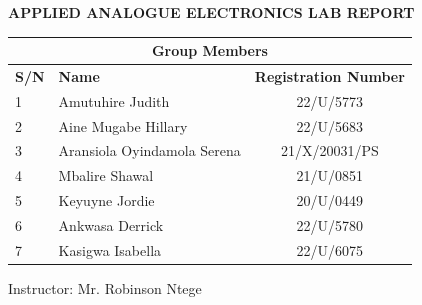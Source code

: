 \documentclass[12pt,a4paper]{article}
\begin{document}
\begin{titlepage}
\begin{center}
            \textbf{\Large APPLIED ANALOGUE ELECTRONICS LAB REPORT}\\
            \vspace{30pt}
            \begin{table}[H]
            \centering
            \begin{tabular}{|llc|}
            \hline
            \multicolumn{3}{|c|}{\textbf{Group Members}}                                                                     \\ \hline
            \multicolumn{1}{|l|}{\textbf{S/N}} & \multicolumn{1}{l|}{\textbf{Name}}           & \textbf{Registration Number} \\ \hline
            \multicolumn{1}{|l|}{1}            & \multicolumn{1}{l|}{Amutuhire Judith}        & 22/U/5773                    \\ \hline
            \multicolumn{1}{|l|}{2}            & \multicolumn{1}{l|}{Aine Mugabe Hillary}     & 22/U/5683                    \\ \hline
            \multicolumn{1}{|l|}{3}            & \multicolumn{1}{l|}{Aransiola Oyindamola Serena} & 21/X/20031/PS                \\ \hline
            \multicolumn{1}{|l|}{4}            & \multicolumn{1}{l|}{Mbalire Shawal} & 21/U/0851                \\ \hline
            \multicolumn{1}{|l|}{5}            & \multicolumn{1}{l|}{Keyuyne Jordie} & 20/U/0449                \\ \hline
            \multicolumn{1}{|l|}{6}            & \multicolumn{1}{l|}{Ankwasa Derrick} & 22/U/5780                \\ \hline
            \multicolumn{1}{|l|}{7}            & \multicolumn{1}{l|}{Kasigwa Isabella} & 22/U/6075                \\ \hline
            \end{tabular}
            \end{table}
        
            \vspace{40pt}

            \normalsize Instructor: Mr. Robinson Ntege\\
            \vspace{30pt}

            \normalsize \date{\today}
            \vspace{40pt}

        \end{center}
    \end{titlepage}
\end{document}

